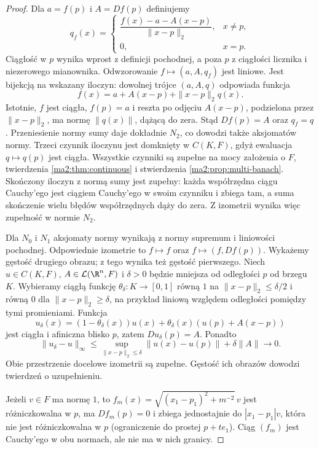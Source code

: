 \begin{proof}
Dla $a=f(p)$ i $A=Df(p)$ definiujemy
\[
 q_f(x)=
 \begin{cases}
 \dfrac{f(x)-a-A(x-p)}{\|x-p\|_2},&x\ne p,\\
 0,&x=p.
 \end{cases}
\]
Ciągłość w $p$ wynika wprost z definicji pochodnej,
a poza $p$ z ciągłości licznika i niezerowego mianownika.
Odwzorowanie $f\mapsto(a,A,q_f)$ jest liniowe.
Jest bijekcją na wskazany iloczyn: dowolnej trójce
$(a,A,q)$ odpowiada funkcja
\[
 f(x)=a+A(x-p)+\|x-p\|_2q(x).
\]
Istotnie, $f$ jest ciągła, $f(p)=a$ i reszta
po odjęciu $A(x-p)$, podzielona przez $\|x-p\|_2$,
ma normę $\|q(x)\|$, dążącą do zera.
Stąd $Df(p)=A$ oraz $q_f=q$.
Przeniesienie normy sumy daje dokładnie $N_2$,
co dowodzi także aksjomatów normy.
Trzeci czynnik iloczynu jest domknięty w $C(K,F)$,
gdyż ewaluacja $q\mapsto q(p)$ jest ciągła.
Wszystkie czynniki są zupełne na mocy założenia o $F$,
twierdzenia \ref{ma2:thm:continuous} i stwierdzenia
\ref{ma2:prop:multi-banach}. Skończony iloczyn z normą
sumy jest zupełny: każda współrzędna ciągu Cauchy'ego
jest ciągiem Cauchy'ego w swoim czynniku i zbiega tam,
a suma skończenie wielu błędów współrzędnych dąży do zera.
Z izometrii wynika więc zupełność w normie $N_2$.

Dla $N_0$ i $N_1$ aksjomaty normy wynikają
z normy supremum i liniowości pochodnej.
Odpowiednie izometrie to $f\mapsto f$ oraz
$f\mapsto(f,Df(p))$. Wykażemy gęstość drugiego
obrazu; z tego wynika też gęstość pierwszego.
Niech $u\in C(K,F)$, $A\in\mathcal L(\R^n,F)$
i $\delta>0$ będzie mniejsza od odległości
$p$ od brzegu $K$. Wybieramy ciągłą funkcję
$\theta_\delta:K\to[0,1]$ równą $1$ na
$\|x-p\|_2\le\delta/2$ i równą $0$ dla
$\|x-p\|_2\ge\delta$, na przykład liniową
względem odległości pomiędzy tymi promieniami.
Funkcja
\[
 u_\delta(x)=(1-\theta_\delta(x))u(x)
       +\theta_\delta(x)(u(p)+A(x-p))
\]
jest ciągła i afiniczna blisko $p$, zatem
$Du_\delta(p)=A$. Ponadto
\[
 \|u_\delta-u\|_\infty
 \le\sup_{\|x-p\|_2\le\delta}\|u(x)-u(p)\|
                  +\delta\|A\|\to0.
\]
Obie przestrzenie docelowe izometrii są zupełne.
Gęstość ich obrazów dowodzi twierdzeń o uzupełnieniu.

Jeżeli $v\in F$ ma normę $1$, to
$f_m(x)=\sqrt{(x_1-p_1)^2+m^{-2}}\,v$
jest różniczkowalna w $p$, ma $Df_m(p)=0$
i zbiega jednostajnie do $|x_1-p_1|v$,
która nie jest różniczkowalna w $p$
(ograniczenie do prostej $p+te_1$).
Ciąg $(f_m)$ jest Cauchy'ego w obu normach,
ale nie ma w nich granicy.


\end{proof}
